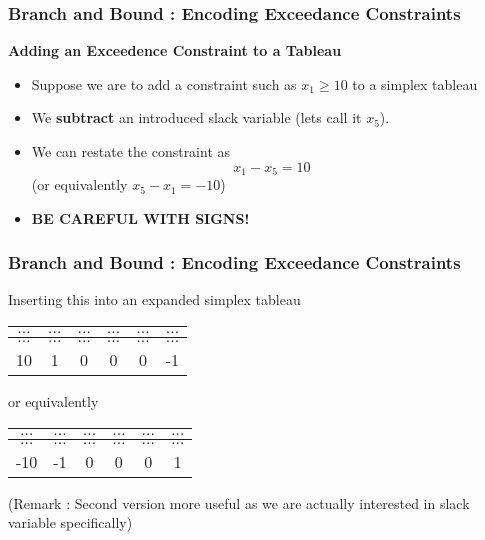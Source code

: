 \documentclass{beamer}
\begin{document}
	\begin{frame}
		\frametitle{Branch and Bound : Encoding Exceedance Constraints}
		\large
	\noindent \textbf{Adding an Exceedence Constraint to a Tableau}
		\begin{itemize}
			\item Suppose we are to add a constraint such as $x_1 \geq 10$ to a simplex tableau
			\item We \textbf{subtract} an introduced slack variable (lets call it $x_5$).
			\item We can restate the constraint as \[x_1 -x_5 = 10\] (or equivalently $x_5-x_1=-10$)
			\item \textbf{\alert{BE CAREFUL WITH SIGNS!}}
		\end{itemize}
\end{frame}
\begin{frame}
	\frametitle{Branch and Bound : Encoding Exceedance Constraints}
	\large
Inserting this into an expanded simplex tableau
\begin{center}
	\begin{tabular}{|c||c|c|c|c|c|}
		
		\hline  $\ldots$ &$\ldots$  & $\ldots$ &$\ldots$  &$\ldots$  &$\ldots$  \\ 
	\hline  $\ldots$ &$\ldots$  & $\ldots$ &$\ldots$  &$\ldots$  &$\ldots$  \\ 
		\hline 10 & 1  & 0 & 0 & 0 & -1 \\ 
		\hline 
	\end{tabular} 
\end{center}
or equivalently
\begin{center}
	\begin{tabular}{|c||c|c|c|c|c|}
		\hline  $\ldots$ &$\ldots$  & $\ldots$ &$\ldots$  &$\ldots$  &$\ldots$  \\ 
		\hline  $\ldots$ &$\ldots$  & $\ldots$ &$\ldots$  &$\ldots$  &$\ldots$  \\ 
		\hline -10 & -1  & 0 & 0 & 0 & 1 \\
		\hline 
	\end{tabular} 
\end{center}
(Remark : Second version more useful as we are actually interested in slack variable specifically)
\end{frame}
\end{document}
